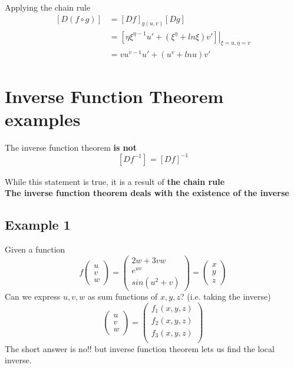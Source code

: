 Applying the chain rule
\begin{align*}
   \left[ D (f \circ g) \right]_{} &= \left[ D f \right]_{g(u, v)} \left[ D g \right]_{} \\
                                   &= \left. \left[\eta\xi^{\eta-1}u' + (\xi^\eta + ln\xi) v'\right]\right|_{
                                      \xi = u, \eta = v
                                   } \\
                                   &= vu^{v-1}u' + (u^v + lnu) v'
\end{align*}


\section{Inverse Function Theorem examples}

\begin{framed}
   The inverse function theorem \textbf{is not} \[
      \left[ D f^{-1} \right]_{} = \left[ D f \right]_{}^{-1}
   \] 

   While this statement is true, it is a result of \textbf{the chain rule} \\

   \textbf{The inverse function theorem deals with the existence of the inverse}
\end{framed}

\subsection{Example 1}
Given a function \[
  f \begin{pmatrix} u \\ v \\ w \end{pmatrix}  = \begin{pmatrix} 
    2w + 3vw \\
    e^{uv} \\
    sin(u^2 + v)
  \end{pmatrix} = \begin{pmatrix}  x \\ y \\ z\end{pmatrix} 
\] 
Can we express $u, v, w$ as sum functions of $x, y, z$? (i.e. taking the inverse)\[
  \begin{pmatrix} u \\ v \\ w \end{pmatrix}  = \begin{pmatrix} 
    f_1(x, y, z)   \\
    f_2(x, y, z)   \\
    f_3(x, y, z)   \\
  \end{pmatrix}
\] 
The short answer is no!! but inverse function theorem lets us find the local inverse. \\

